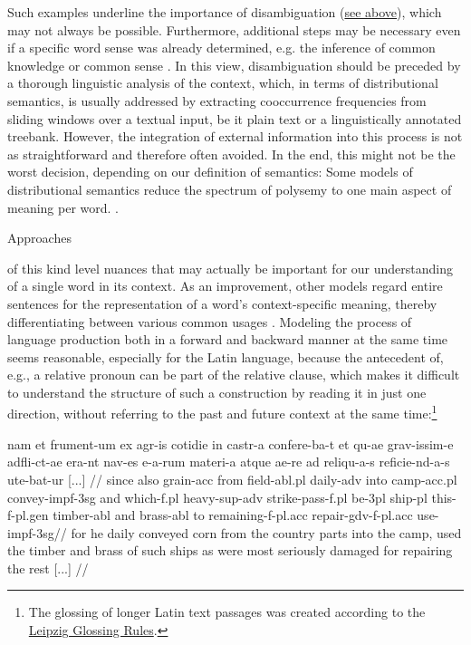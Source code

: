 Such examples underline the importance of disambiguation (\hyperref[polysemyProblemForSemanticRelations]{see above}), which may not always be possible. Furthermore, additional steps may be necessary even if a specific word sense was already determined, e.g. the inference of common knowledge or common sense \parencite[427f.]{pinkalSemantik1993}. In this view, disambiguation should be preceded by a thorough linguistic analysis of the context, which, in terms of distributional semantics, is usually addressed by extracting cooccurrence frequencies from sliding windows over a textual input, be it plain text or a linguistically annotated treebank. However, the integration of external information into this process is not as straightforward and therefore often avoided. In the end, this might not be the worst decision, depending on our definition of semantics: Some models of distributional semantics reduce the spectrum of polysemy to one main aspect of meaning per word.
\parencite[4]{faruquiProblemsEvaluationWord2016}.

\hypertarget{ELMO}{Approaches} of this kind level nuances that may actually be important for our understanding of a single word in its context. As an improvement, other models regard entire sentences for the representation of a word's context-specific meaning, thereby differentiating between various common usages \parencite[2f.]{petersDeepContextualizedWord2018}. Modeling the process of language production both in a forward and backward manner at the same time seems reasonable, especially for the Latin language, because the antecedent of, e.g., a relative pronoun can be part of the relative clause, which makes it difficult to understand the structure of such a construction by reading it in just one direction, without referring to the past and future context at the same time:\footnote{The glossing of longer Latin text passages was created according to the \href{https://www.eva.mpg.de/lingua/pdf/Glossing-Rules.pdf}{Leipzig Glossing Rules}.}

\vspace{10pt}
\ex[exno=PROIEL 53467]
	\par
	\begingl
		\gla nam et frument-um ex agr-is cotidie in castr-a confere-ba-t et qu-ae grav-issim-e adfli-ct-ae era-nt nav-es e-a-rum materi-a atque ae-re ad reliqu-a-s reficie-nd-a-s ute-bat-ur [...] //
		\glb since also grain-{\sc acc} from field-{\sc abl.pl} daily-{\sc adv} into camp-{\sc acc.pl} convey-{\sc impf-3sg} and which-{\sc f.pl} heavy-{\sc sup-adv} strike-{\sc pass-f.pl} be-{\sc 3pl} ship-{\sc pl} this-{\sc f-pl.gen} timber-{\sc abl} and brass-{\sc abl} to remaining-{\sc f-pl.acc} repair-{\sc gdv-f-pl.acc} use-{\sc impf-3sg}//
		\glft for he daily conveyed corn from the country parts into the camp, used the timber and brass of such ships as were most seriously damaged for repairing the rest [...] \parencite{mcdevitteCaesarGallicWar1869} //
	\endgl
\xe
\vspace{10pt}

